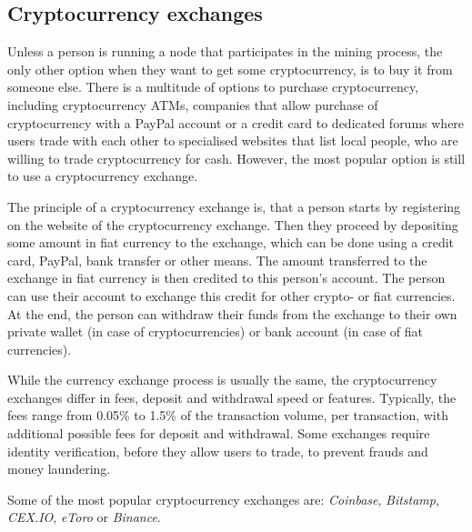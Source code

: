 \subsection{Cryptocurrency exchanges}

Unless a person is running a node that participates in the mining process, the only other option when they want to get some cryptocurrency, is to buy it from someone else. There is a multitude of options to purchase cryptocurrency, including cryptocurrency ATMs, companies that allow purchase of cryptocurrency with a PayPal account or a credit card to dedicated forums where users trade with each other to specialised websites that list local people, who are willing to trade cryptocurrency for cash. However, the most popular option is still to use a cryptocurrency exchange. 

The principle of a cryptocurrency exchange is, that a person starts by registering on the website of the cryptocurrency exchange. Then they proceed by depositing some amount in fiat currency to the exchange, which can be done using a credit card, PayPal, bank transfer or other means. The amount transferred to the exchange in fiat currency is then credited to this person's account. The person can use their account to exchange this credit for other crypto- or fiat currencies. At the end, the person can withdraw their funds from the exchange to their own private wallet (in case of cryptocurrencies) or bank account (in case of fiat currencies).

While the currency exchange process is usually the same, the cryptocurrency exchanges differ in fees, deposit and withdrawal speed or features. Typically, the fees range from 0.05\% to 1.5\% of the transaction volume, per transaction, with additional possible fees for deposit and withdrawal\footnotemark. 
% 
% 
Some exchanges require identity verification, before they allow users to trade, to prevent frauds and money laundering.\footnotemark
% 

Some of the most popular cryptocurrency exchanges are: \textit{Coinbase}, \textit{Bitstamp}, \textit{CEX.IO}, \textit{eToro} or \textit{Binance}\footnotemark.
% 
